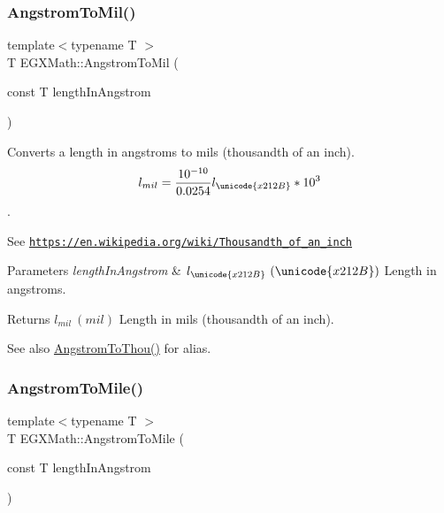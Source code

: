 \subsubsection{\texorpdfstring{Angstrom\+To\+Mil()}{AngstromToMil()}}
{\footnotesize\ttfamily template$<$typename T $>$ \\
T E\+G\+X\+Math\+::\+Angstrom\+To\+Mil (\begin{DoxyParamCaption}\item[{const T}]{length\+In\+Angstrom }\end{DoxyParamCaption})}



Converts a length in angstroms to mils (thousandth of an inch). \[ l_{mil}= \frac{10^{-10}}{0.0254} l_{\unicode{x212B}} * 10^{3} \]. 

See \href{https://en.wikipedia.org/wiki/Thousandth_of_an_inch}{\tt https\+://en.\+wikipedia.\+org/wiki/\+Thousandth\+\_\+of\+\_\+an\+\_\+inch} 
\begin{DoxyParams}{Parameters}
{\em length\+In\+Angstrom} & $ l_{\unicode{x212B}}\ (\unicode{x212B})$ Length in angstroms. \\
\hline
\end{DoxyParams}
\begin{DoxyReturn}{Returns}
$ l_{mil}\ (mil)$ Length in mils (thousandth of an inch). 
\end{DoxyReturn}
\begin{DoxySeeAlso}{See also}
\mbox{\hyperlink{group___e_g_x_math-_conversions-_length_conversions-_non-_s_i-_angstrom-_imperial_gafdf126044e17b0d3e0d83e510ba11990}{Angstrom\+To\+Thou()}} for alias. 
\end{DoxySeeAlso}
\mbox{\label{group___e_g_x_math-_conversions-_length_conversions-_non-_s_i-_angstrom-_imperial_ga184d0b1ccefcc2e210a8a42530573bac}} 
\subsubsection{\texorpdfstring{Angstrom\+To\+Mile()}{AngstromToMile()}}
{\footnotesize\ttfamily template$<$typename T $>$ \\
T E\+G\+X\+Math\+::\+Angstrom\+To\+Mile (\begin{DoxyParamCaption}\item[{const T}]{length\+In\+Angstrom }\end{DoxyParamCaption})}



